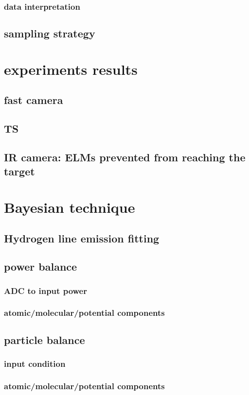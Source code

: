\subsubsection{data interpretation}
\subsection{sampling strategy}
\section{experiments results}
\subsection{fast camera}
\subsection{TS}
\subsection{IR camera: ELMs prevented from reaching the target}
\section{Bayesian technique}
\subsection{Hydrogen line emission fitting}
\subsection{power balance}
\subsubsection{ADC to input power}
\subsubsection{atomic/molecular/potential components}
\subsection{particle balance}
\subsubsection{input condition}
\subsubsection{atomic/molecular/potential components}
